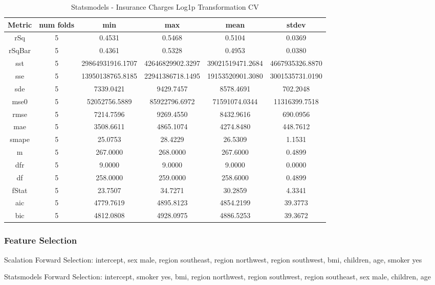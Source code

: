 \documentclass{article}
\begin{document}
\begin{table}[H]
\centering
\caption{Statsmodels - Insurance Charges Log1p Transformation CV}
\label{tab:Statsmodels - Insurance Charges Log1p Transformation CV}
\begin{tabular}{|c|c|c|c|c|c|}\hline
Metric & num folds & min & max & mean & stdev \\ \hline \hline
rSq & 5 & 0.4531 & 0.5468 & 0.5104 & 0.0369 \\ \hline
rSqBar & 5 & 0.4361 & 0.5328 & 0.4953 & 0.0380 \\ \hline
sst & 5 & 29864931916.1707 & 42646829902.3297 & 39021519471.2684 & 4667935326.8870 \\ \hline
sse & 5 & 13950138765.8185 & 22941386718.1495 & 19153520901.3080 & 3001535731.0190 \\ \hline
sde & 5 & 7339.0421 & 9429.7457 & 8578.4691 & 702.2048 \\ \hline
mse0 & 5 & 52052756.5889 & 85922796.6972 & 71591074.0344 & 11316399.7518 \\ \hline
rmse & 5 & 7214.7596 & 9269.4550 & 8432.9616 & 690.0956 \\ \hline
mae & 5 & 3508.6611 & 4865.1074 & 4274.8480 & 448.7612 \\ \hline
smape & 5 & 25.0753 & 28.4229 & 26.5309 & 1.1531 \\ \hline
m & 5 & 267.0000 & 268.0000 & 267.6000 & 0.4899 \\ \hline
dfr & 5 & 9.0000 & 9.0000 & 9.0000 & 0.0000 \\ \hline
df & 5 & 258.0000 & 259.0000 & 258.6000 & 0.4899 \\ \hline
fStat & 5 & 23.7507 & 34.7271 & 30.2859 & 4.3341 \\ \hline
aic & 5 & 4779.7619 & 4895.8123 & 4854.2199 & 39.3773 \\ \hline
bic & 5 & 4812.0808 & 4928.0975 & 4886.5253 & 39.3672 \\ \hline
\end{tabular}
\end{table}

\subsubsection{Feature Selection}

Scalation Forward Selection: intercept, sex male, region southeast, region northwest, region southwest, bmi, children, age, smoker yes

Statsmodels Forward Selection: intercept, smoker yes, bmi, region northwest, region southwest, region southeast, sex male, children, age
\end{document}
